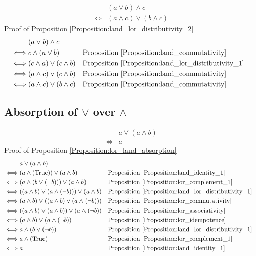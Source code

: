 \begin{prop}
\label{Proposition:land_lor_distributivity_2}
\begin{align*}
& (a \lor b) \land c \\
\iff & (a \land c) \lor (b \land c)
\end{align*}
Proof of Proposition \ref{Proposition:land_lor_distributivity_2}
\begin{align*}
& (a \lor b) \land c \\
\iff & c \land (a \lor b)
& & \text{Proposition \ref{Proposition:land_commutativity}} \\
\iff & (c \land a) \lor (c \land b)
& & \text{Proposition \ref{Proposition:land_lor_distributivity_1}} \\
\iff & (a \land c) \lor (c \land b)
& & \text{Proposition \ref{Proposition:land_commutativity}} \\
\iff & (a \land c) \lor (b \land c)
& & \text{Proposition \ref{Proposition:land_commutativity}} \\
\end{align*}
\end{prop}

\subsection{Absorption of $\lor$ over $\land$}
\begin{prop}
\label{Proposition:lor_land_absorption}
\begin{align*}
& a \lor (a \land b) \\
\iff & a
\end{align*}
Proof of Proposition \ref{Proposition:lor_land_absorption}
\begin{align*}
& a \lor (a \land b) \\
\iff & (a \land (\text{True})) \lor (a \land b)
& & \text{Proposition \ref{Proposition:land_identity_1}} \\
\iff & (a \land (b \lor (\lnot b))) \lor (a \land b)
& & \text{Proposition \ref{Proposition:lor_complement_1}} \\
\iff & ((a \land b) \lor (a \land (\lnot b))) \lor (a \land b)
& & \text{Proposition \ref{Proposition:land_lor_distributivity_1}} \\
\iff & (a \land b) \lor ((a \land b) \lor (a \land (\lnot b)))
& & \text{Proposition \ref{Proposition:lor_commutativity}} \\
\iff & ((a \land b) \lor (a \land b)) \lor (a \land (\lnot b))
& & \text{Proposition \ref{Proposition:lor_associativity}} \\
\iff & (a \land b) \lor (a \land (\lnot b))
& & \text{Proposition \ref{Proposition:lor_idempotence}} \\
\iff & a \land (b \lor (\lnot b))
& & \text{Proposition \ref{Proposition:land_lor_distributivity_1}} \\
\iff & a \land (\text{True})
& & \text{Proposition \ref{Proposition:lor_complement_1}} \\
\iff & a
& & \text{Proposition \ref{Proposition:land_identity_1}} \\
\end{align*}
\end{prop}

